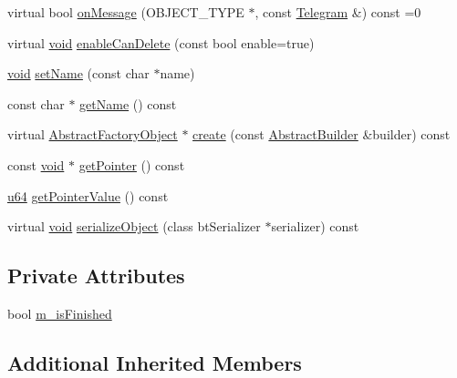 \begin{DoxyCompactItemize}
virtual bool \mbox{\hyperlink{classnjli_1_1_abstract_state_aa486b2e60e57d789855acdfb555a4cdc}{on\+Message}} (O\+B\+J\+E\+C\+T\+\_\+\+T\+Y\+PE $\ast$, const \mbox{\hyperlink{classnjli_1_1_telegram}{Telegram}} \&) const =0
\item 
virtual \mbox{\hyperlink{_thread_8h_af1e856da2e658414cb2456cb6f7ebc66}{void}} \mbox{\hyperlink{classnjli_1_1_abstract_state_a4ed007508bd8f80af668a302376b7d1a}{enable\+Can\+Delete}} (const bool enable=true)
\item 
\mbox{\hyperlink{_thread_8h_af1e856da2e658414cb2456cb6f7ebc66}{void}} \mbox{\hyperlink{classnjli_1_1_abstract_state_a087eb5f8d9f51cc476f12f1d10a3cb95}{set\+Name}} (const char $\ast$name)
\item 
const char $\ast$ \mbox{\hyperlink{classnjli_1_1_abstract_state_ad41266885be835f3ee602311e20877a4}{get\+Name}} () const
\item 
virtual \mbox{\hyperlink{classnjli_1_1_abstract_factory_object}{Abstract\+Factory\+Object}} $\ast$ \mbox{\hyperlink{classnjli_1_1_abstract_state_a83a8876ae63b92804004cf3febe76573}{create}} (const \mbox{\hyperlink{classnjli_1_1_abstract_builder}{Abstract\+Builder}} \&builder) const
\item 
const \mbox{\hyperlink{_thread_8h_af1e856da2e658414cb2456cb6f7ebc66}{void}} $\ast$ \mbox{\hyperlink{classnjli_1_1_abstract_state_ac4ca71716ed832be357f15f8262c8448}{get\+Pointer}} () const
\item 
\mbox{\hyperlink{_util_8h_ad758b7a5c3f18ed79d2fcd23d9f16357}{u64}} \mbox{\hyperlink{classnjli_1_1_abstract_state_a4ffddf141a426a5a07d0ac19f1913811}{get\+Pointer\+Value}} () const
\item 
virtual \mbox{\hyperlink{_thread_8h_af1e856da2e658414cb2456cb6f7ebc66}{void}} \mbox{\hyperlink{classnjli_1_1_abstract_state_a4fc4bcd9d1930911474210c047372fc0}{serialize\+Object}} (class bt\+Serializer $\ast$serializer) const
\end{DoxyCompactItemize}
\subsection*{Private Attributes}
\begin{DoxyCompactItemize}
\item 
bool \mbox{\hyperlink{classnjli_1_1_abstract_state_a445a5d1ac7572b8b01b81937c89e960c}{m\+\_\+is\+Finished}}
\end{DoxyCompactItemize}
\subsection*{Additional Inherited Members}


